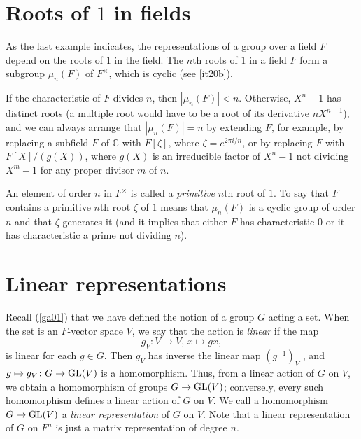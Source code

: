 \documentclass[a4paper,11pt,final]{memoir}%
\theoremstyle{nonumberplain}
\begin{document}
\section{Roots of \texorpdfstring{$1$}{1} in fields}

As the last example indicates, the representations of a group over a field $F$
depend on the roots of $1$ in the field. The $n$th roots of $1$ in a field $F$
form a subgroup $\mu_{n}(F)$ of $F^{\times}$, which is cyclic (see \ref{it20b}).

If the characteristic of $F$ divides $n$, then $|\mu_{n}(F)|<n$. Otherwise,
$X^{n}-1$ has distinct roots (a multiple root would have to be a root of its
derivative $nX^{n-1}$), and we can always arrange that $|\mu_{n}(F)|=n$ by
extending $F$, for example, by replacing a subfield $F$ of $\mathbb{C}{}$ with
$F[\zeta]$, where $\zeta=e^{2\pi i/n}$, or by replacing $F$ with
$F[X]/(g(X))$, where $g(X)$ is an irreducible factor of $X^{n}-1$ not dividing
$X^{m}-1$ for any proper divisor $m$ of $n.$

An element of order $n$ in $F^{\times}$ is called a \emph{primitive} $n$th
root of $1$. To say that $F$ contains a primitive $n$th root $\zeta$ of $1$
means that $\mu_{n}(F)$ is a cyclic group of order $n$ and that $\zeta$
generates it (and it implies that either $F$ has characteristic $0$ or it has
characteristic a prime not dividing $n$).

\section{Linear representations}

Recall (\ref{ga01}) that we have defined the notion of a group $G$ acting a
set. When the set is an $F$-vector space $V$, we say that the action is
\emph{linear}
%
if the map
\[
g_{V}\colon V\rightarrow V\text{, }x\mapsto gx,
\]
is linear for each $g\in G$. Then $g_{V}$ has inverse the linear map
$(g^{-1})_{V}$ , and $g\mapsto g_{V}\colon G\rightarrow\operatorname{GL}(V)$ is a
homomorphism. Thus, from a linear action of $G$ on $V$, we obtain a
homomorphism of groups $G\rightarrow\operatorname{GL}(V)$; conversely, every such
homomorphism defines a linear action of $G$ on $V$. We call a homomorphism
$G\rightarrow\operatorname{GL}(V)$ a \emph{linear representation}%
of $G$ on $V$. Note that a linear representation of $G$ on $F^{n}$ is just a
matrix representation of degree $n$.
\end{document}
